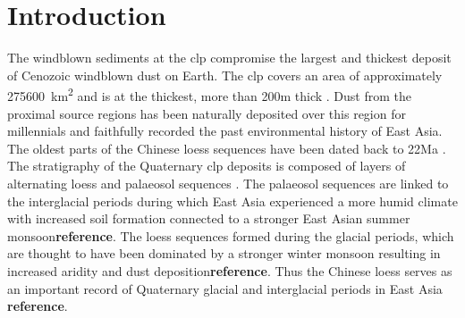 \thispagestyle{plain}
\chapter{Introduction}
The windblown sediments at the \acrfull{clp} compromise the largest and thickest deposit of Cenozoic windblown dust on Earth. The \acrshort{clp} covers an area of approximately \SI{275600}{\kilo\metre\squared} and is at the thickest, more than 200\si{\metre} thick .
Dust from the proximal source regions has been naturally deposited over this region for millennials and faithfully recorded the past environmental history of East Asia. 
The oldest parts of the Chinese loess sequences have been dated back to 22Ma \parencite{qiang2011new}. 
The stratigraphy of the Quaternary \acrshort{clp} deposits is composed of layers of alternating loess and palaeosol sequences \parencite{derbyshire1995variations}. 
The palaeosol sequences are linked to the interglacial periods during which East Asia experienced a more humid climate with increased soil formation connected to a stronger East Asian summer monsoon\textbf{reference}. 
The loess sequences formed during the glacial periods, which are thought to have been dominated by a stronger winter monsoon resulting in increased aridity and dust deposition\textbf{reference}.
Thus the Chinese loess serves as an important record of Quaternary glacial and interglacial periods in East Asia \textbf{reference}.

